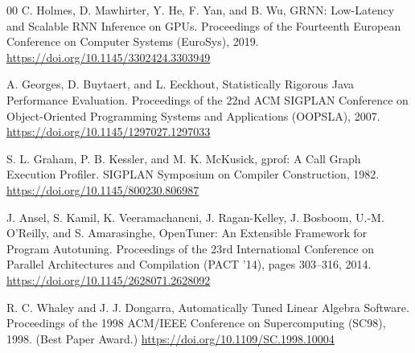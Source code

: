 \documentclass[conference]{IEEEtran}
\begin{document}
\begin{thebibliography}{00}
C. Holmes, D. Mawhirter, Y. He, F. Yan, and B. Wu, GRNN:
Low-Latency and Scalable RNN Inference on GPUs. Proceedings of the
Fourteenth European Conference on Computer Systems (EuroSys), 2019.
\url{https://doi.org/10.1145/3302424.3303949}

A. Georges, D. Buytaert, and L. Eeckhout, Statistically Rigorous
Java Performance Evaluation. Proceedings of the 22nd ACM SIGPLAN
Conference on Object-Oriented Programming Systems and Applications
(OOPSLA), 2007.
\url{https://doi.org/10.1145/1297027.1297033}

S. L. Graham, P. B. Kessler, and M. K. McKusick, gprof: A Call
Graph Execution Profiler. SIGPLAN Symposium on Compiler Construction,
1982. \url{https://doi.org/10.1145/800230.806987}

J. Ansel, S. Kamil, K. Veeramachaneni, J. Ragan-Kelley,
J. Bosboom, U.-M. O'Reilly, and S. Amarasinghe, OpenTuner: An
Extensible Framework for Program Autotuning. Proceedings of the
23rd International Conference on Parallel Architectures and
Compilation (PACT '14), pages 303--316, 2014.
\url{https://doi.org/10.1145/2628071.2628092}

R. C. Whaley and J. J. Dongarra, Automatically Tuned Linear
Algebra Software. Proceedings of the 1998 ACM/IEEE Conference
on Supercomputing (SC98), 1998. (Best Paper Award.)
\url{https://doi.org/10.1109/SC.1998.10004}

\end{thebibliography}


\end{document}
